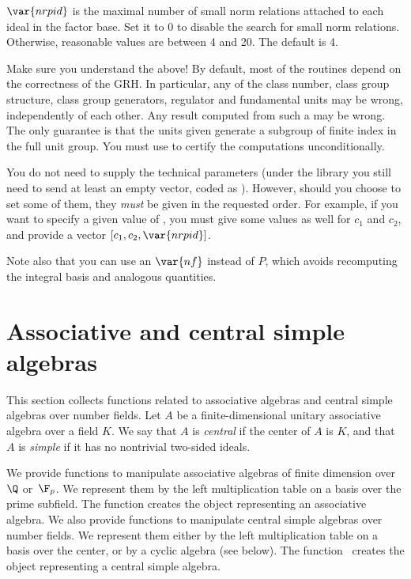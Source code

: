 $\var{nrpid}$ is the maximal number of small norm relations attached to each
ideal in the factor base. Set it to $0$ to disable the search for small norm
relations. Otherwise, reasonable values are between 4 and 20. The default is
4.

 Make sure you understand the above! By default, most of
the  routines depend on the correctness of the GRH. In particular,
any of the class number, class group structure, class group generators,
regulator and fundamental units may be wrong, independently of each other.
Any result computed from such a  may be wrong. The only guarantee is
that the units given generate a subgroup of finite index in the full unit
group. You must use  to certify the computations
unconditionally.


You do not need to supply the technical parameters (under the library you
still need to send at least an empty vector, coded as ). However,
should you choose to set some of them, they \emph{must} be given in the
requested order. For example, if you want to specify a given value of
, you must give some values as well for $c_1$ and $c_2$, and provide
a vector $[c_1,c_2,\var{nrpid}]$.

Note also that you can use an $\var{nf}$ instead of $P$, which avoids
recomputing the integral basis and analogous quantities.

\smallskip


\section{Associative and central simple algebras}

This section collects functions related to associative algebras and central
simple algebras over number fields. Let $A$ be a finite-dimensional unitary
associative algebra over a field $K$. We say that $A$ is \emph{central} if
the center of $A$ is $K$, and that $A$ is \emph{simple} if it has no
nontrivial two-sided ideals.

We provide functions to manipulate associative algebras of finite
dimension over~$\Q$ or~$\F_p$. We represent them by the left multiplication
table on a basis over the prime subfield. The function 
creates the object representing an associative algebra. We also provide
functions to manipulate central simple algebras over number fields. We
represent them either by the left multiplication table on a basis over the
center, or by a cyclic algebra (see below). The function~ creates
the object representing a central simple algebra.

